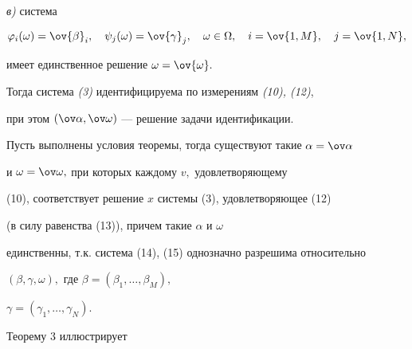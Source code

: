 \begin{thm}
\begin{equation}
\end{equation}





{\em в)} система


\begin{equation}


\varphi_i(\omega) = \ov{\beta}_i,\quad


\psi_j(\omega) = \ov{\gamma}_j,\quad


\omega\in\Omega, \quad i=\ov{1,M},\quad j=\ov{1,N},


\end{equation}


имеет единственное решение $\omega = \ov{\omega}.$





Тогда система {\em (3)} идентифицируема по измерениям {\em (10), (12)},


при этом $(\ov\alpha,\ov\omega)$ --- решение задачи идентификации.


\end{thm}





\begin{pf}


Пусть выполнены условия теоремы, тогда существуют такие $\alpha=\ov\alpha$


и $\omega=\ov\omega,$ при которых каждому $v,$ удовлетворяющему


(10), соответствует решение $x$ системы (3), удовлетворяющее (12)


(в силу равенства (13)), причем такие $\alpha$ и $\omega$


единственны, т.к. система (14), (15) однозначно разрешима относительно


$(\beta,\gamma,\omega),$ где $\beta=(\beta_1,\dotsc,\beta_M),$


$\gamma=(\gamma_1,\dotsc,\gamma_N).$


\end{pf}





Теорему 3 иллюстрирует





